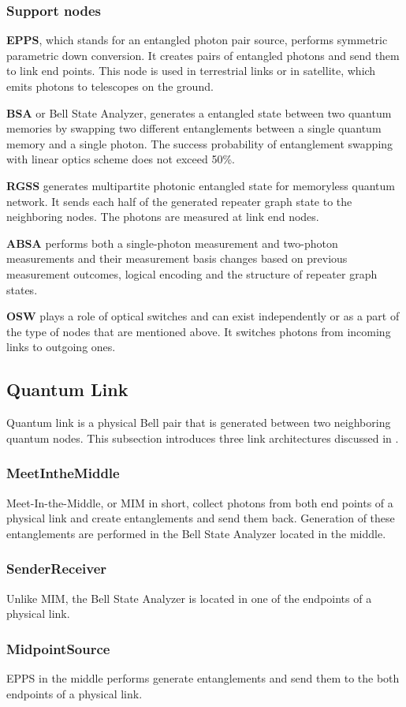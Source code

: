 \subsubsection{Support nodes}

\textbf{EPPS}, which stands for an entangled photon pair source, performs symmetric parametric down conversion.
It creates pairs of entangled photons and send them to link end points. This node is used in terrestrial links or in satellite, which emits photons to telescopes on the ground.

\textbf{BSA} or Bell State Analyzer, generates a entangled state between two quantum memories by swapping two different entanglements between a single quantum memory and a single photon.
The success probability of entanglement swapping with linear optics scheme does not exceed 50\%.

\textbf{RGSS} generates multipartite photonic entangled state for memoryless quantum network. It sends each half of the generated repeater graph state to the neighboring nodes.
The photons are measured at link end nodes.

\textbf{ABSA} performs both a single-photon measurement and two-photon measurements and their measurement basis changes based on previous measurement outcomes, logical encoding and the structure of repeater graph states.

\textbf{OSW} plays a role of optical switches and can exist independently or as a part of the type of nodes that are mentioned above.
It switches photons from incoming links to outgoing ones.

\subsection{Quantum Link}
Quantum link is a physical Bell pair that is generated between two neighboring quantum nodes.  This subsection introduces three link architectures discussed in \cite{jones2016design}.

\subsubsection{MeetIntheMiddle}

Meet-In-the-Middle, or MIM in short, collect photons from both end points of a physical link and create entanglements and send them back. Generation of these entanglements are performed in the Bell State Analyzer located in the middle.

\subsubsection{SenderReceiver}

Unlike MIM, the Bell State Analyzer is located in one of the endpoints of a physical link.

\subsubsection{MidpointSource}

EPPS in the middle performs generate entanglements and send them to the both endpoints of a physical link.


